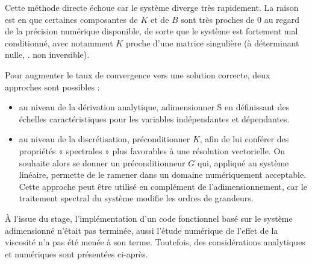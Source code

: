 Cette méthode directe échoue car le système diverge très rapidement. La raison est en que certaines composantes de $K$ et de $B$ sont très proches de 0 au regard de la précision numérique disponible, de sorte que le système est fortement mal conditionné, avec notamment $K$ proche d'une matrice singulière (à déterminant nulle, \ie. non inversible).

Pour augmenter le taux de convergence vers une solution correcte, deux approches sont possibles :
\begin{itemize}
    \item au niveau de la dérivation analytique, adimensionner S en définissant des échelles caractéristiques pour les variables indépendantes et dépendantes.
    \item au niveau de la discrétisation, préconditionner $K$, afin de lui conférer des propriétés « spectrales » plus favorables à une résolution vectorielle. On souhaite alors se donner un préconditionneur $G$ qui, appliqué au système linéaire, permette de le ramener dans un domaine numériquement acceptable. Cette approche peut être utilisé en complément de l'adimensionnement, car le traitement spectral du système modifie les ordres de grandeurs.
\end{itemize}

À l'issue du stage, l'implémentation d'un code fonctionnel basé sur le système adimensionné n'était pas terminée, aussi l'étude numérique de l'effet de la viscosité n'a pas été menée à son terme. Toutefois, des considérations analytiques et numériques sont présentées ci-après.


